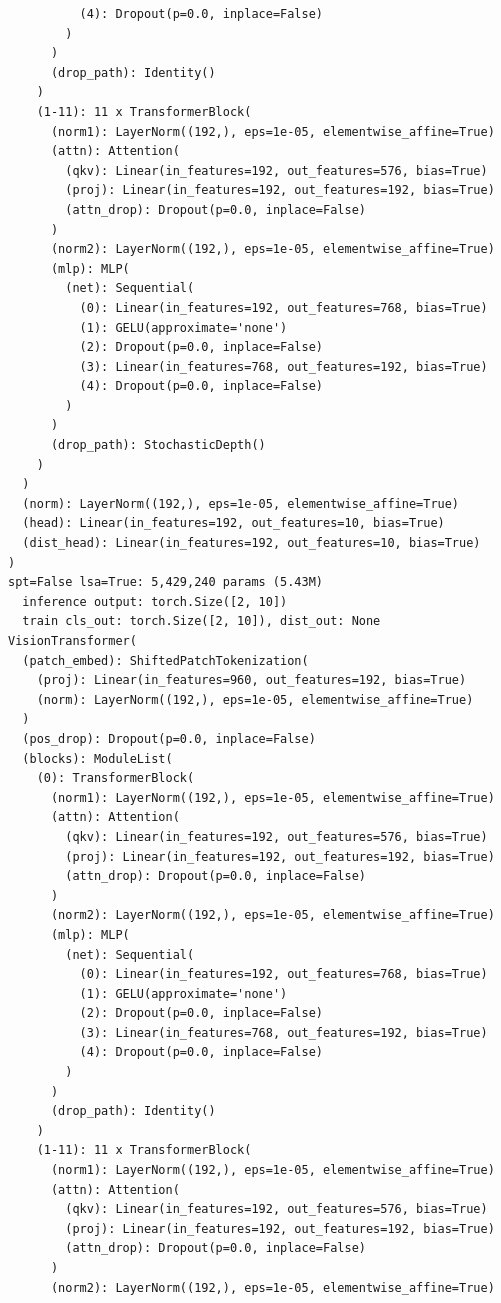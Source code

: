 \documentclass[11pt]{article}
\begin{document}
\begin{verbatim}
          (4): Dropout(p=0.0, inplace=False)
        )
      )
      (drop_path): Identity()
    )
    (1-11): 11 x TransformerBlock(
      (norm1): LayerNorm((192,), eps=1e-05, elementwise_affine=True)
      (attn): Attention(
        (qkv): Linear(in_features=192, out_features=576, bias=True)
        (proj): Linear(in_features=192, out_features=192, bias=True)
        (attn_drop): Dropout(p=0.0, inplace=False)
      )
      (norm2): LayerNorm((192,), eps=1e-05, elementwise_affine=True)
      (mlp): MLP(
        (net): Sequential(
          (0): Linear(in_features=192, out_features=768, bias=True)
          (1): GELU(approximate='none')
          (2): Dropout(p=0.0, inplace=False)
          (3): Linear(in_features=768, out_features=192, bias=True)
          (4): Dropout(p=0.0, inplace=False)
        )
      )
      (drop_path): StochasticDepth()
    )
  )
  (norm): LayerNorm((192,), eps=1e-05, elementwise_affine=True)
  (head): Linear(in_features=192, out_features=10, bias=True)
  (dist_head): Linear(in_features=192, out_features=10, bias=True)
)
spt=False lsa=True: 5,429,240 params (5.43M)
  inference output: torch.Size([2, 10])
  train cls_out: torch.Size([2, 10]), dist_out: None
VisionTransformer(
  (patch_embed): ShiftedPatchTokenization(
    (proj): Linear(in_features=960, out_features=192, bias=True)
    (norm): LayerNorm((192,), eps=1e-05, elementwise_affine=True)
  )
  (pos_drop): Dropout(p=0.0, inplace=False)
  (blocks): ModuleList(
    (0): TransformerBlock(
      (norm1): LayerNorm((192,), eps=1e-05, elementwise_affine=True)
      (attn): Attention(
        (qkv): Linear(in_features=192, out_features=576, bias=True)
        (proj): Linear(in_features=192, out_features=192, bias=True)
        (attn_drop): Dropout(p=0.0, inplace=False)
      )
      (norm2): LayerNorm((192,), eps=1e-05, elementwise_affine=True)
      (mlp): MLP(
        (net): Sequential(
          (0): Linear(in_features=192, out_features=768, bias=True)
          (1): GELU(approximate='none')
          (2): Dropout(p=0.0, inplace=False)
          (3): Linear(in_features=768, out_features=192, bias=True)
          (4): Dropout(p=0.0, inplace=False)
        )
      )
      (drop_path): Identity()
    )
    (1-11): 11 x TransformerBlock(
      (norm1): LayerNorm((192,), eps=1e-05, elementwise_affine=True)
      (attn): Attention(
        (qkv): Linear(in_features=192, out_features=576, bias=True)
        (proj): Linear(in_features=192, out_features=192, bias=True)
        (attn_drop): Dropout(p=0.0, inplace=False)
      )
      (norm2): LayerNorm((192,), eps=1e-05, elementwise_affine=True)

\end{verbatim}
\end{document}
